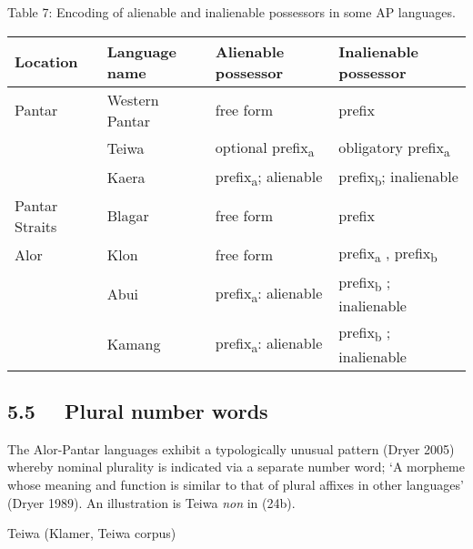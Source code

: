 {\centering
Table 7: Encoding of alienable and inalienable possessors in some AP languages. 
\par}

\begin{center}
\tablehead{}
\begin{supertabular}{m{1.0608599in}m{1.1775599in}m{1.4490598in}m{1.5636599in}}
\hline
Location &
Language name &
Alienable possessor &
Inalienable possessor\\\hline
Pantar &
Western Pantar &
free form &
prefix \\
 &
Teiwa &
optional prefix\textsubscript{a}  &
obligatory prefix\textsubscript{a} \\
 &
Kaera  &
prefix\textsubscript{a}; alienable &
prefix\textsubscript{b}; inalienable\\
Pantar Straits &
Blagar &
free form &
prefix\\
Alor &
Klon &
free form &
prefix\textsubscript{a} , prefix\textsubscript{b} \\
 &
Abui &
prefix\textsubscript{a}: alienable &
prefix\textsubscript{b} ; inalienable\\
 &
Kamang &
prefix\textsubscript{a}: alienable &
prefix\textsubscript{b} ; inalienable\\\hline
\end{supertabular}
\end{center}
\subsection[5.5 \ \ Plural number words]{5.5 \ \ Plural number words}
The Alor-Pantar languages exhibit a typologically unusual pattern (Dryer 2005) whereby nominal plurality is indicated via a separate number word; {\textquoteleft}A morpheme whose meaning and function is similar to that of plural affixes in other languages{\textquoteright} (Dryer 1989). An illustration is Teiwa \textit{non }in (24b). 

Teiwa (Klamer, Teiwa corpus) 

